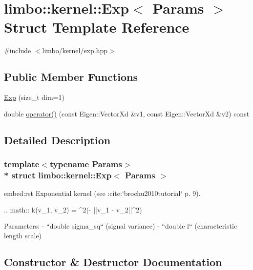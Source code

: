 \hypertarget{structlimbo_1_1kernel_1_1_exp}{}\section{limbo\+:\+:kernel\+:\+:Exp$<$ Params $>$ Struct Template Reference}
\label{structlimbo_1_1kernel_1_1_exp}


{\ttfamily \#include $<$limbo/kernel/exp.\+hpp$>$}

\subsection*{Public Member Functions}
\begin{DoxyCompactItemize}
\item 
\hyperlink{structlimbo_1_1kernel_1_1_exp_abec48720f518fa51be7f74bf102add09}{Exp} (size\+\_\+t dim=1)
\item 
double \hyperlink{structlimbo_1_1kernel_1_1_exp_a50951330db2210da72d2ea8fc9ef8b96}{operator()} (const Eigen\+::\+Vector\+Xd \&v1, const Eigen\+::\+Vector\+Xd \&v2) const 
\end{DoxyCompactItemize}


\subsection{Detailed Description}
\subsubsection*{template$<$typename Params$>$\\*
struct limbo\+::kernel\+::\+Exp$<$ Params $>$}

\begin{DoxyVerb}embed:rst
Exponential kernel (see :cite:`brochu2010tutorial` p. 9).

.. math::
    k(v_1, v_2)  = \sigma^2\exp \Big(- ||v_1 - v_2||^2\Big)

Parameters:
  - ``double sigma_sq`` (signal variance)
  - ``double l`` (characteristic length scale)
\end{DoxyVerb}
 

\subsection{Constructor \& Destructor Documentation}
